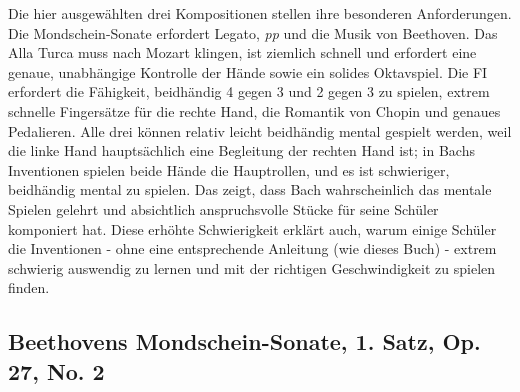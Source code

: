 Die hier ausgewählten drei Kompositionen stellen ihre besonderen Anforderungen.
Die Mondschein-Sonate erfordert Legato, \textit{pp} und die Musik von Beethoven.
Das Alla Turca muss nach Mozart klingen, ist ziemlich schnell und erfordert eine genaue, unabhängige Kontrolle der Hände sowie ein solides Oktavspiel.
Die FI erfordert die Fähigkeit, beidhändig 4 gegen 3 und 2 gegen 3 zu spielen, extrem schnelle Fingersätze für die rechte Hand, die Romantik von Chopin und genaues Pedalieren.
Alle drei können relativ leicht beidhändig mental gespielt werden, weil die linke Hand hauptsächlich eine Begleitung der rechten Hand ist; in Bachs Inventionen spielen beide Hände die Hauptrollen, und es ist schwieriger, beidhändig mental zu spielen.
Das zeigt, dass Bach wahrscheinlich das mentale Spielen gelehrt und absichtlich anspruchsvolle Stücke für seine Schüler komponiert hat.
Diese erhöhte Schwierigkeit erklärt auch, warum einige Schüler die Inventionen - ohne eine entsprechende Anleitung (wie dieses Buch) - extrem schwierig auswendig zu lernen und mit der richtigen Geschwindigkeit zu spielen finden.


\subsection{Beethovens Mondschein-Sonate, 1. Satz, Op. 27, No. 2}\hypertarget{c1ii25b}{}

